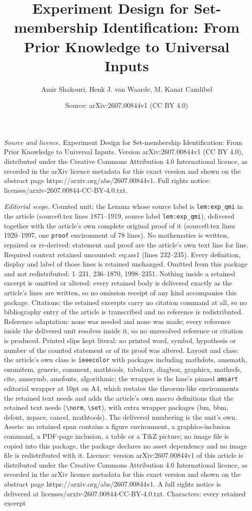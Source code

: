 \documentclass[10pt,a4paper]{amsart}
\title[Experiment Design for Set-membership Identification: From Pr]{Experiment Design for Set-membership Identification: From Prior Knowledge to Universal Inputs}
\author{Amir Shakouri, Henk J. van Waarde, M. Kanat Camlibel}
\date{Source: arXiv:2607.00844v1 (CC BY 4.0)}
\begin{document}
\maketitle

\noindent\emph{Source and licence.} Experiment Design for Set-membership Identification: From Prior Knowledge to Universal Inputs. Version arXiv:2607.00844v1 (CC BY 4.0), distributed under the Creative Commons Attribution 4.0 International licence, as recorded in the arXiv licence metadata for this exact version and shown on the abstract page https://arxiv.org/abs/2607.00844v1. Full rights notice: licenses/arxiv-2607.00844-CC-BY-4.0.txt.\par\smallskip

\noindent\textit{Editorial scope.} Counted unit: the Lemma whose source label is \texttt{lem:exp\_qmi} in the article (source0.tex lines 1871--1919, source label \texttt{lem:exp\_qmi}), delivered together with the article's own complete original proof of it (source0.tex lines 1920--1997, one \texttt{proof} environment of 78 lines). No mathematics is written, repaired or re-derived: statement and proof are the article's own text line for line. Required context retained uncounted: eq:ass1 (lines 232--235). Every definition, display and label of those lines is retained unchanged. Omitted from this package and not redistributed: 1--231, 236--1870, 1998--2351. Nothing inside a retained excerpt is omitted or altered: every retained body is delivered exactly as the article's lines are written, so no omission receipt of any kind accompanies this package. Citations: the retained excerpts carry no citation command at all, so no bibliography entry of the article is transcribed and no reference is redistributed. Reference adaptation: none was needed and none was made; every reference inside the delivered unit resolves inside it, so no unresolved reference or citation is produced. Printed slips kept literal: no printed word, symbol, hypothesis or number of the counted statement or of its proof was altered. Layout and class: the article's own class is \texttt{ieeecolor} with packages including mathdots, amsmath, enumitem, generic, comment, mathtools, tabularx, diagbox, graphicx, mathrsfs, cite, amssymb, amsfonts, algorithmic; the wrapper is the lane's pinned \texttt{amsart} editorial wrapper at 10pt on A4, which restates the theorem-like environments the retained text needs and adds the article's own macro definitions that the retained text needs (\texttt{\textbackslash norm}, \texttt{\textbackslash set}), with extra wrapper packages (bm, bbm, dsfont, xspace, cancel, mathtools). The delivered numbering is the unit's own. Assets: no retained span contains a figure environment, a graphics-inclusion command, a PDF-page inclusion, a table or a TikZ picture; no image file is copied into this package, the package declares no asset dependency and no image file is redistributed with it. Licence: version arXiv:2607.00844v1 of this article is distributed under the Creative Commons Attribution 4.0 International licence, as recorded in the arXiv licence metadata for this exact version and shown on the abstract page https://arxiv.org/abs/2607.00844v1. A full rights notice is delivered at licenses/arxiv-2607.00844-CC-BY-4.0.txt. Characters: every retained excerpt 
\end{document}
